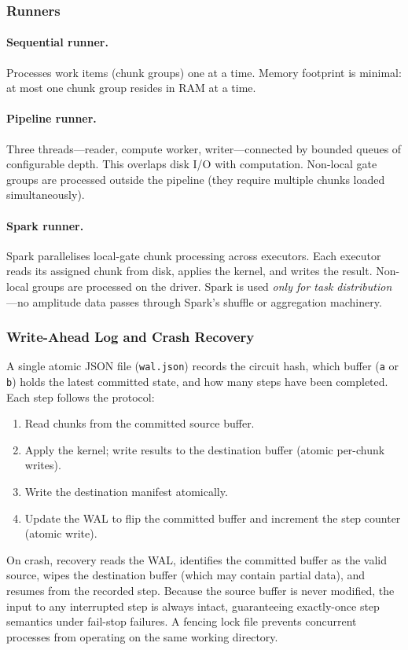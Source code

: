 \subsubsection{Runners}
\label{sec:runners}

\paragraph{Sequential runner.}
Processes work items (chunk groups) one at a time. Memory footprint is
minimal: at most one chunk group resides in RAM at a time.

\paragraph{Pipeline runner.}
Three threads---reader, compute worker, writer---connected by bounded
queues of configurable depth. This overlaps disk I/O with computation.
Non-local gate groups are processed outside the pipeline (they require
multiple chunks loaded simultaneously).

\paragraph{Spark runner.}
Spark parallelises local-gate chunk processing across executors. Each
executor reads its assigned chunk from disk, applies the kernel, and
writes the result. Non-local groups are processed on the driver.
Spark is used \emph{only for task distribution}---no amplitude data
passes through Spark's shuffle or aggregation machinery.

\subsubsection{Write-Ahead Log and Crash Recovery}
\label{sec:wal}

A single atomic JSON file (\texttt{wal.json}) records the circuit hash,
which buffer (\texttt{a} or \texttt{b}) holds the latest committed
state, and how many steps have been completed. Each step follows the
protocol:
\begin{enumerate}
  \item Read chunks from the committed source buffer.
  \item Apply the kernel; write results to the destination buffer
    (atomic per-chunk writes).
  \item Write the destination manifest atomically.
  \item Update the WAL to flip the committed buffer and increment the
    step counter (atomic write).
\end{enumerate}
On crash, recovery reads the WAL, identifies the committed buffer as
the valid source, wipes the destination buffer (which may contain
partial data), and resumes from the recorded step. Because the source
buffer is never modified, the input to any interrupted step is always
intact, guaranteeing exactly-once step semantics under fail-stop
failures. A fencing lock file prevents concurrent processes from
operating on the same working directory.

